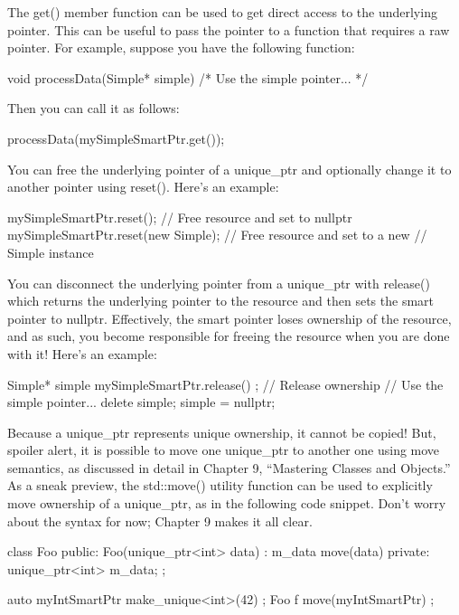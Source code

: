 The get() member function can be used to get direct access to the underlying pointer. This can be useful to pass the pointer to a function that requires a raw pointer. For example, suppose you have the following function:

\begin{cpp}
void processData(Simple* simple) { /* Use the simple pointer... */ }
\end{cpp}

Then you can call it as follows:

\begin{cpp}
processData(mySimpleSmartPtr.get());
\end{cpp}

You can free the underlying pointer of a unique\_ptr and optionally change it to another pointer using reset(). Here’s an example:

\begin{cpp}
mySimpleSmartPtr.reset(); // Free resource and set to nullptr
mySimpleSmartPtr.reset(new Simple{}); // Free resource and set to a new
// Simple instance
\end{cpp}

You can disconnect the underlying pointer from a unique\_ptr with release() which returns the underlying pointer to the resource and then sets the smart pointer to nullptr. Effectively, the smart pointer loses ownership of the resource, and as such, you become responsible for freeing the resource when you are done with it! Here’s an example:

\begin{cpp}
Simple* simple { mySimpleSmartPtr.release() }; // Release ownership
// Use the simple pointer...
delete simple;
simple = nullptr;
\end{cpp}

Because a unique\_ptr represents unique ownership, it cannot be copied! But, spoiler alert, it is possible to move one unique\_ptr to another one using move semantics, as discussed in detail in Chapter 9, “Mastering Classes and Objects.” As a sneak preview, the std::move() utility function can be used to explicitly move ownership of a unique\_ptr, as in the following code snippet. Don’t worry about the syntax for now; Chapter 9 makes it all clear.

\begin{cpp}
class Foo
{
    public:
    Foo(unique_ptr<int> data) : m_data { move(data) } { }
    private:
    unique_ptr<int> m_data;
};

auto myIntSmartPtr { make_unique<int>(42) };
Foo f { move(myIntSmartPtr) };
\end{cpp}


